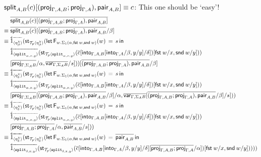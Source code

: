 \documentclass[10pt]{article}
\theoremstyle{definition}
\newcommand\dsd[1]{\ensuremath{\mathsf{#1}}}
\newcommand{\app}[2]{\ensuremath{#1 \: #2}}
\newcommand{\fst}[1]{\app{\dsd{fst}}{#1}}
\newcommand{\snd}[1]{\app{\dsd{snd}}{#1}}
\newcommand{\rewrite}[2]{\overleftarrow{#1}(#2)}
\newcommand\StI[2]{\ensuremath{\mathsf{st}_{#1}(#2)}}
\newcommand\FEs[4]{\ensuremath{\mathsf{let} \, \mathsf{F}_{#1}(#3) \, = \, {#2} \, \mathsf{in} \, #4}}
\newcommand\ApEl[2]{\mathcal{T}_{#1}\langle#2\rangle}
\begin{document}
\begin{enumerate}[style = multiline, labelwidth = 80pt]
\item[{$\mathsf{split}_{A,B}(c)\allowbreak[(\mathsf{proj}_{\Gamma, A, B};\mathsf{proj}_{\Gamma, A}), \allowbreak\mathsf{pair}_{A,B}] \equiv c$}:] 
This one should be `easy'!
\begin{align*}
&\upstairs{\qsplit{A,B}(c)[(\proj{\Gamma, A, B};\proj{\Gamma, A}),\qpair{A,B}]} \\
\equiv{} &\upstairs{\qsplit{A,B}(c)}[\upstairs{(\proj{\Gamma, A, B};\proj{\Gamma, A}),\qpair{A,B}}/\beta] \\
\equiv{} &\rewrite{1_{\langle \eta^\chi_\beta \rangle}}{\StI{\ApEl{p}{\eta^\chi_\beta}}{\FEs{w. \Sigma_1(\alpha,\fst w, \snd w)}{s}{w}{\\&\rewrite{\ApOne{\tsplit{\alpha,x,y}}}{\StI{\ApEl{p}{\tsplit{\alpha,x,y}}}{\upstairs{c}[\into{\Gamma, A, B}[\into{\Gamma, A}/\beta, y/y] /\delta]}[\fst w/x, \snd w/y]}})\\&[\upstairs{\proj{\Gamma, \Sigma_A B}}/\alpha, \upstairs{\qvar{\Gamma, \Sigma_A B}}/s]}}[\upstairs{(\proj{\Gamma, A, B};\proj{\Gamma, A}),\qpair{A,B}}/\beta] \\
\equiv{} &\rewrite{1_{\langle \eta^\chi_\delta \rangle}}{\StI{\ApEl{p}{\eta^\chi_\delta}}{\FEs{w. \Sigma_1(\alpha,\fst w, \snd w)}{s}{w}{\\&\rewrite{\ApOne{\tsplit{\alpha,x,y}}}{\StI{\ApEl{p}{\tsplit{\alpha,x,y}}}{\upstairs{c}[\into{\Gamma, A, B}[\into{\Gamma, A}/\beta, y/y] /\delta]}[\fst w/x, \snd w/y]}})\\&[\upstairs{\proj{\Gamma, \Sigma_A B}}[\upstairs{(\proj{\Gamma, A, B};\proj{\Gamma, A}),\qpair{A,B}}/\beta]/\alpha, \upstairs{\qvar{\Gamma, \Sigma_A B}}[\upstairs{(\proj{\Gamma, A, B};\proj{\Gamma, A}),\qpair{A,B}}/\beta]/s]}} \\
\equiv{} &\rewrite{1_{\langle \eta^\chi_\delta \rangle}}{\StI{\ApEl{p}{\eta^\chi_\delta}}{\FEs{w. \Sigma_1(\alpha,\fst w, \snd w)}{s}{w}{\\&\rewrite{\ApOne{\tsplit{\alpha,x,y}}}{\StI{\ApEl{p}{\tsplit{\alpha,x,y}}}{\upstairs{c}[\into{\Gamma, A, B}[\into{\Gamma, A}/\beta, y/y] /\delta]}[\fst w/x, \snd w/y]}})\\&[\upstairs{\proj{\Gamma, A, B};\proj{\Gamma, A}}/\alpha, \upstairs{\qpair{A,B}}/s]}} \\
\equiv{} &\rewrite{1_{\langle \eta^\chi_\delta \rangle}}{\StI{\ApEl{p}{\eta^\chi_\delta}}{\FEs{w. \Sigma_1(\alpha,\fst w, \snd w)}{\upstairs{\qpair{A,B}}}{w}{\\&\rewrite{\ApOne{\tsplit{\delta,x,y}}}{\StI{\ApEl{p}{\tsplit{\delta,x,y}}}{\upstairs{c}[\into{\Gamma, A, B}[\into{\Gamma, A}/\beta, y/y] /\delta][\upstairs{\proj{\Gamma, A, B};\proj{\Gamma, A}}/\alpha]}[\fst w/x, \snd w/y]}})}} \\

\end{align*}
\end{enumerate}
\end{document}
